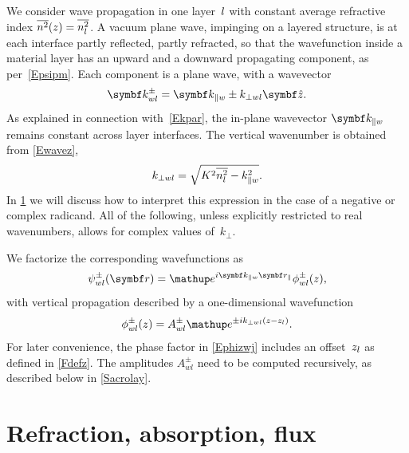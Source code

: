 We consider wave propagation in one layer~$l$
%
with constant average refractive index $\overline{n^2}(z)=\overline{n_l^2}$.
A vacuum plane wave, impinging on a layered structure,
is at each interface partly reflected, partly refracted,
so that the wavefunction inside a material layer
has an upward and a downward propagating component,
as per~\cref{Epsipm}.
Each component is a plane wave,
with a wavevector
\begin{equation}\label{Ekpmwj3}
  \k^\pm_{w\il}= \k_{\plll w} \pm k_{\perp w\il}\v{\hat z}.
\end{equation}
%
%
As explained in connection with~\cref{Ekpar},
the in-plane wavevector $\k_{\plll w}$ remains constant
across layer interfaces.
The vertical wavenumber is obtained from \cref{Ewavez},
\begin{equation}\label{Ekperpwj}
  k_{\perp wl} = \sqrt{K^2 \overline{n_l^2} - k_{\parallel w}^2}.
\end{equation}
In \cref{Smulayabs} we will discuss how to interpret this expression
in the case of a negative or complex radicand.
All of the following, unless explicitly restricted to real wavenumbers,
allows for complex values of~$k_\perp$.

We factorize the corresponding wavefunctions as
\begin{equation}\label{Eplawafa}
  \psi^\pm_{w\il}(\r)=\e^{i\k_{\plll w}\r_\plll}\phi^\pm_{w\il}(z),
\end{equation}
with vertical propagation described by a one-dimensional wavefunction
\begin{equation}\label{Ephizwj}
  \phi^\pm_{w\il}(z)=A^\pm_{w\il}\e^{\pm ik_{\perp w\il}(z-z_\il)}.
\end{equation}
%
For later convenience,
the phase factor in \cref{Ephizwj} includes an offset~$z_l$
as defined in \cref{Fdefz}.
%
%
%
The amplitudes $A^\pm_{wl}$ need to be computed recursively,
as described below in \cref{Sacrolay}.

\section{Refraction, absorption, flux}\label{Smulayabs}

